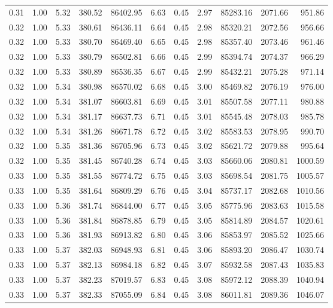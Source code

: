 \begin{table}[!ht]
\begin{tabular}{rrrrrrrrrrr}
0.31 & 1.00 & 5.32 & 380.52 & 86402.95 & 6.63 & 0.45 & 2.97 & 85283.16 & 2071.66 & 951.86 \\
0.32 & 1.00 & 5.33 & 380.61 & 86436.11 & 6.64 & 0.45 & 2.98 & 85320.21 & 2072.56 & 956.66 \\
0.32 & 1.00 & 5.33 & 380.70 & 86469.40 & 6.65 & 0.45 & 2.98 & 85357.40 & 2073.46 & 961.46 \\
0.32 & 1.00 & 5.33 & 380.79 & 86502.81 & 6.66 & 0.45 & 2.99 & 85394.74 & 2074.37 & 966.29 \\
0.32 & 1.00 & 5.33 & 380.89 & 86536.35 & 6.67 & 0.45 & 2.99 & 85432.21 & 2075.28 & 971.14 \\
0.32 & 1.00 & 5.34 & 380.98 & 86570.02 & 6.68 & 0.45 & 3.00 & 85469.82 & 2076.19 & 976.00 \\
0.32 & 1.00 & 5.34 & 381.07 & 86603.81 & 6.69 & 0.45 & 3.01 & 85507.58 & 2077.11 & 980.88 \\
0.32 & 1.00 & 5.34 & 381.17 & 86637.73 & 6.71 & 0.45 & 3.01 & 85545.48 & 2078.03 & 985.78 \\
0.32 & 1.00 & 5.34 & 381.26 & 86671.78 & 6.72 & 0.45 & 3.02 & 85583.53 & 2078.95 & 990.70 \\
0.32 & 1.00 & 5.35 & 381.36 & 86705.96 & 6.73 & 0.45 & 3.02 & 85621.72 & 2079.88 & 995.64 \\
0.32 & 1.00 & 5.35 & 381.45 & 86740.28 & 6.74 & 0.45 & 3.03 & 85660.06 & 2080.81 & 1000.59 \\
0.33 & 1.00 & 5.35 & 381.55 & 86774.72 & 6.75 & 0.45 & 3.03 & 85698.54 & 2081.75 & 1005.57 \\
0.33 & 1.00 & 5.35 & 381.64 & 86809.29 & 6.76 & 0.45 & 3.04 & 85737.17 & 2082.68 & 1010.56 \\
0.33 & 1.00 & 5.36 & 381.74 & 86844.00 & 6.77 & 0.45 & 3.05 & 85775.96 & 2083.63 & 1015.58 \\
0.33 & 1.00 & 5.36 & 381.84 & 86878.85 & 6.79 & 0.45 & 3.05 & 85814.89 & 2084.57 & 1020.61 \\
0.33 & 1.00 & 5.36 & 381.93 & 86913.82 & 6.80 & 0.45 & 3.06 & 85853.97 & 2085.52 & 1025.66 \\
0.33 & 1.00 & 5.37 & 382.03 & 86948.93 & 6.81 & 0.45 & 3.06 & 85893.20 & 2086.47 & 1030.74 \\
0.33 & 1.00 & 5.37 & 382.13 & 86984.18 & 6.82 & 0.45 & 3.07 & 85932.58 & 2087.43 & 1035.83 \\
0.33 & 1.00 & 5.37 & 382.23 & 87019.57 & 6.83 & 0.45 & 3.08 & 85972.12 & 2088.39 & 1040.94 \\
0.33 & 1.00 & 5.37 & 382.33 & 87055.09 & 6.84 & 0.45 & 3.08 & 86011.81 & 2089.36 & 1046.07 \\

\end{tabular}
\end{table}
